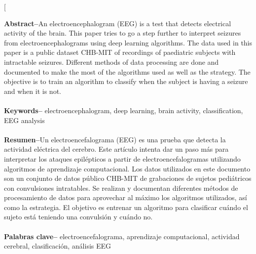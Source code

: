 ﻿\documentclass[10pt,a4paper,twocolumn,twoside]{article}
\begin{document}
\twocolumn[\begin{@twocolumnfalse}


\maketitle

\thispagestyle{primerapagina}
\begin{center}
\parbox{0.915\textwidth}
{\sffamily
\textbf{Abstract--}An electroencephalogram (EEG) is a test that detects electrical activity of the brain. This paper tries to go a step further to interpret seizures from electroencephalograms using deep learning algorithms. The data used in this paper is a public dataset CHB-MIT\cite{bbddCHBMIT} of recordings of paediatric subjects with intractable seizures. Different methods of data processing are done and documented to make the most of the algorithms used as well as the strategy. The objective is to train an algorithm to classify when the subject is having a seizure and when it is not.
\\
\\
\textbf{Keywords-- }electroencephalogram, deep learning, brain activity, classification, EEG analysis\\
\bigskip
\\
\textbf{Resumen--}Un electroencefalograma (EEG) es una prueba que detecta la actividad eléctrica del cerebro. Este artículo intenta dar un paso más para interpretar los ataques epilépticos a partir de electroencefalogramas utilizando algoritmos de aprendizaje computacional. Los datos utilizados en este documento son un conjunto de datos público CHB-MIT\cite{bbddCHBMIT} de grabaciones de sujetos pediátricos con convulsiones intratables. Se realizan y documentan diferentes métodos de procesamiento de datos para aprovechar al máximo los algoritmos utilizados, así como la estrategia. El objetivo es entrenar un algoritmo para clasificar cuándo el sujeto está teniendo una convulsión y cuándo no.
\\
\\
\textbf{Palabras clave-- }electroencefalograma, aprendizaje computacional, actividad cerebral, clasificación, análisis EEG\\
}


\end{center}
\end{@twocolumnfalse}
\end{document}
